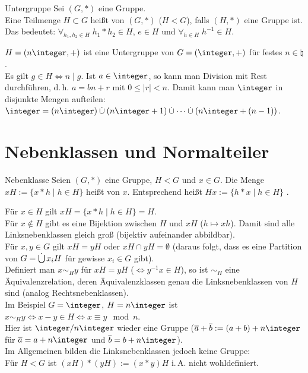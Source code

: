 \linie

\begin{Def}{Untergruppe}
    Sei $(G, \ast)$ eine Gruppe.\\
    Eine Teilmenge $H \subset G$ heißt  von $(G, \ast)$
    ($H < G$), falls $(H, \ast)$ eine Gruppe ist.\\
    Das bedeutet:
    $\forall_{h_1, h_2 \in H}\; h_1 \ast h_2 \in H$, $e \in H$ und
    $\forall_{h \in H}\; h^{-1} \in H$.
\end{Def}

\begin{Bsp}
    $H = (n\integer, +)$ ist eine Untergruppe von $G = (\integer, +)$ für
    festes $n \in \natural$.\\
    Es gilt $g \in H \iff n \;|\; g$.
    Ist $a \in \integer$, so kann man Division mit Rest durchführen, d.\,h.
    $a = bn + r$ mit $0 \le |r| < n$.
    Damit kann man $\integer$ in disjunkte Mengen aufteilen:\\
    $\integer = (n\integer) \dcup (n\integer + 1) \dcup \dotsb \dcup
    (n\integer + (n - 1))$.
\end{Bsp}

\section{%
    Nebenklassen und Normalteiler%
}

\begin{Def}{Nebenklasse}
    Seien $(G, \ast)$ eine Gruppe, $H < G$ und $x \in G$.
    Die Menge $xH := \{x \ast h \;|\; h \in H\}$ heißt
     von $x$.
    Entsprechend heißt $Hx := \{h \ast x \;|\; h \in H\}$
    .
\end{Def}

\begin{Bem}
    Für $x \in H$ gilt $xH = \{x \ast h \;|\; h \in H\} = H$.\\
    Für $x \notin H$ gibt es eine Bijektion zwischen $H$ und $xH$
    ($h \mapsto xh$).
    Damit sind alle Linksnebenklassen gleich groß
    (bijektiv aufeinander abbildbar).\\
    Für $x, y \in G$ gilt $xH = yH$ oder $xH \cap yH = \emptyset$
    (daraus folgt, dass es eine Partition von $G = \mathop{\dot{\bigcup}} x_i H$
    für gewisse $x_i \in G$ gibt).\\
    Definiert man $x \sim_H y$ für $xH = yH$ ($\!\!\iff y^{-1} x \in H$),
    so ist $\sim_H$ eine Äquivalenzrelation,
    deren Äquivalenzklassen genau die Linksnebenklassen von $H$ sind
    (analog Rechtsnebenklassen).\\
    Im Beispiel $G = \integer$, $H = n\integer$ ist
    $x \sim_H y \iff x - y \in H \iff x \equiv y \mod n$.\\
    Hier ist $\integer/n\integer$ wieder eine Gruppe
    ($\overline{a} + \overline{b} := (a + b) + n\integer$ für
    $\overline{a} = a + n\integer$ und $\overline{b} = b + n\integer$).\\
    Im Allgemeinen bilden die Linksnebenklassen jedoch keine Gruppe:\\
    Für $H < G$ ist $(xH) \ast (yH) := (x \ast y)H$ i.\,A. nicht wohldefiniert.
\end{Bem}

